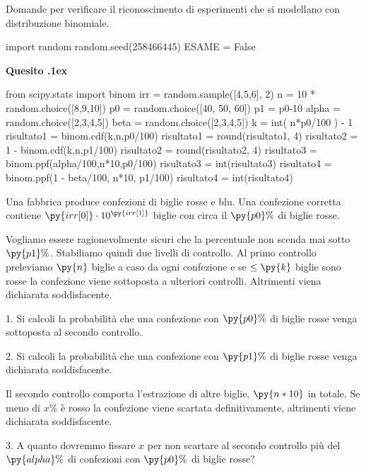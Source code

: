 \documentclass[11pt,twoside,a4paper]{article}
\newcounter{quesito}
\newenvironment{question}{\bigskip\addtocounter{quesito}{1}\bigskip\bigskip\par\textbf{Quesito \thequesito.\kern1ex}}{\vspace{\parskip}}
\begin{document}
\colorbox{blue!10}{\begin{minipage}{\textwidth}
Domande  per verificare il riconoscimento di esperimenti che si modellano con distribuzione binomiale.
\end{minipage}}

\bigskip\bigskip


\begin{pycode}
import random
random.seed(258466445)
ESAME = False
\end{pycode}



\begin{question}
\def\Pr{{\rm Pr\,}}
\def\Ex{{\rm E\,}}
\def\Var{{\rm Var\,}}
\begin{pycode}
from scipy.stats import binom
irr = random.sample([4,5,6], 2)
n = 10 * random.choice([8,9,10])
p0 = random.choice([40, 50, 60])
p1 = p0-10
alpha =  random.choice([2,3,4,5])
beta =  random.choice([2,3,4,5])
k = int( n*p0/100 ) - 1
risultato1 = binom.cdf(k,n,p0/100)
risultato1 = round(risultato1, 4)
risultato2 = 1 - binom.cdf(k,n,p1/100)
risultato2 = round(risultato2, 4)
risultato3 = binom.ppf(alpha/100,n*10,p0/100)
risultato3 = int(risultato3)
risultato4 = binom.ppf(1 - beta/100, n*10, p1/100)
risultato4 = int(risultato4)
\end{pycode}
Una fabbrica produce confezioni di biglie rosse e blu. Una confezione corretta contiene $\py{irr[0]}\cdot 10^{\py{irr[1]}}$ biglie con circa il $\py{p0}\%$ di biglie rosse. 

Vogliamo essere ragionevolmente sicuri che la percentuale non scenda mai sotto $\py{p1}\%$.  Stabiliamo quindi due livelli di controllo. 
Al primo controllo preleviamo $\py{n}$ biglie a caso da ogni confezione e se $\le\py{k}$ biglie sono rosse la confezione viene sottoposta a ulteriori controlli. Altrimenti viena dichiarata soddisfacente.

1. Si calcoli la probabilità che una confezione con $\py{p0}\%$ di biglie rosse venga sottoposta al secondo controllo.

2. Si calcoli la probabilità che una confezione con $\py{p1}\%$ di biglie rosse venga dichiarata soddisfacente.

Il secondo controllo comporta l'estrazione di altre biglie,  $\py{n*10}$ in totale. Se meno di $x\%$ è rosso la confezione viene scartata definitivamente, altrimenti viene dichiarata soddisfacente.

3. A quanto dovremmo fissare $x$ per non scartare al secondo controllo più del $\py{alpha}\%$ di confezioni con $\py{p0}\%$ di biglie rosse?


\end{question}
\end{document}

